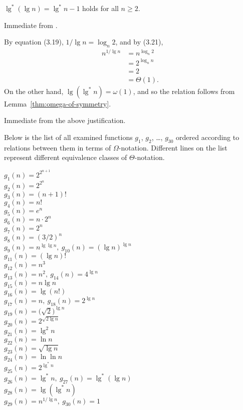 \begin{description}[style=nextline]
    \item[$\lg^*n=\Theta(\lg^*(\lg n))$]
    $\lg^*(\lg n)=\lg^*n-1$ holds for all $n\ge2$.
    \item[$\lg^*(\lg n)=\omega(\lg(\lg^*n))$]
    Immediate from .
    \item[$\lg(\lg^*n)=\omega(n^{1/\!\lg n})$]
    By equation (3.19), $1/\lg n=\log_n2$, and by (3.21),
    \begin{align*}
        n^{1/\lg n} &= n^{\log_n2} \\
        &= 2^{\log_nn} \\
        &= 2\\
        &= \Theta(1).
    \end{align*}
    On the other hand, $\lg(\lg^*n)=\omega(1)$, and so the relation follows from Lemma~\ref{thm:omega-of-symmetry}.
    \item[$n^{1/\lg n}=\Theta(1)$]
    Immediate from the above justification.
\end{description}

Below is the list of all examined functions $g_1$, $g_2$, \dots, $g_{30}$ ordered according to relations between them in terms of $\Omega$-notation.
Different lines on the list represent different equivalence classes of $\Theta$-notation.
\begin{description}
    \item[$g_1(n)=2^{2^{n+1}}$]
    \item[$g_2(n)=2^{2^n}$]
    \item[$g_3(n)=(n+1)!$]
    \item[$g_4(n)=n!$]
    \item[$g_5(n)=e^n$]
    \item[$g_6(n)=n\cdot2^n$]
    \item[$g_7(n)=2^n$]
    \item[$g_8(n)=(3/2)^n$]
    \item[$g_9(n)=n^{\lg\lg n},\ g_{10}(n)=(\lg n)^{\lg n}$]
    \item[$g_{11}(n)=(\lg n)!$]
    \item[$g_{12}(n)=n^3$]
    \item[$g_{13}(n)=n^2,\ g_{14}(n)=4^{\lg n}$]
    \item[$g_{15}(n)=n\lg n$]
    \item[$g_{16}(n)=\lg(n!)$]
    \item[$g_{17}(n)=n,\ g_{18}(n)=2^{\lg n}$]
    \item[$g_{19}(n)=\bigl(\sqrt{2}\bigr)^{\lg n}$]
    \item[$g_{20}(n)=2^{\sqrt{2\lg n}}$]
    \item[$g_{21}(n)=\lg^2n$]
    \item[$g_{22}(n)=\ln n$]
    \item[$g_{23}(n)=\sqrt{\lg n}$]
    \item[$g_{24}(n)=\ln\ln n$]
    \item[$g_{25}(n)=2^{\lg^*n}$]
    \item[$g_{26}(n)=\lg^*n,\ g_{27}(n)=\lg^*(\lg n)$]
    \item[$g_{28}(n)=\lg(\lg^*n)$]
    \item[$g_{29}(n)=n^{1/\lg n},\ g_{30}(n)=1$]
\end{description}
